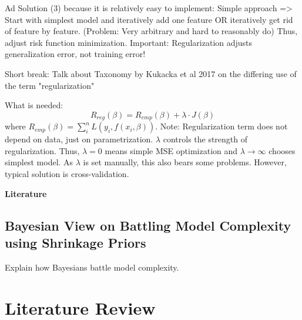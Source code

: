 \documentclass[12pt,a4paper]{article}
\newenvironment{lightbluebox}{%
    \begin{tcolorbox}[colback=lightblue, colframe=lightblue, fontupper=\itshape]%
}{%
    \end{tcolorbox}%
}
\begin{document}
\begin{lightbluebox}
Ad Solution (3) because it is relatively easy to implement: Simple approach => Start with simplest model and iteratively add one feature OR iteratively get rid of feature by feature. (Problem: Very arbitrary and hard to reasonably do) Thus, adjust risk function minimization. Important: Regularization adjusts generalization error, not training error!

Short break: Talk about Taxonomy by Kukacka et al 2017 on the differing use of the term "regularization" 

What is needed: 
\[
R_{reg}(\beta) = R_{emp}(\beta)+ \lambda \cdot J(\beta)
\]
where $R_{emp}(\beta) = \sum_i^n L(y_i, f(x_i, \beta))$. Note: Regularization term does not depend on data, just on parametrization. $\lambda$ controls the strength of regularization. Thus, $\lambda = 0$ means simple MSE optimization and $\lambda \to \infty$ chooses simplest model. As $\lambda$ is set manually, this also bears some problems. However, typical solution is cross-validation. 

\textbf{Literature}
\parencite{Taxonomy2017}
\end{lightbluebox}

\subsection{Bayesian View on Battling Model Complexity using Shrinkage Priors}
Explain how Bayesians battle model complexity. 

\newpage

\section{Literature Review}\label{sec:litreview}
\end{document}
